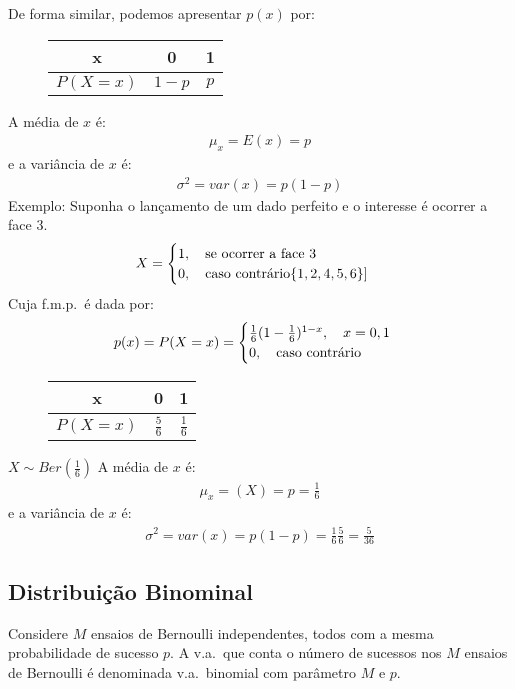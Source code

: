  De forma similar, podemos apresentar $p(x)$ por:
 \begin{figure} 
   \centering
   \begin{tabular}{c c c}
     \toprule
     x&0&1\\ \midrule
     $P(X=x)$&$1-p$&$p$\\ \bottomrule
   \end{tabular}
   \label{fig:7}
 \end{figure}
 A média de $x$ é: 
 \begin{align}
   \mu_{x}=E(x)=p
 \end{align}
 e a variância de $x$ é: 
 \begin{align}
   \sigma^2 = var(x)=p (1-p)
 \end{align}
 Exemplo: Suponha o lançamento de um dado perfeito e o interesse é ocorrer a face
 3.
 \begin{align*}
   X=\begin{cases}
     1, \text{\quad se ocorrer a face }3\\
     0, \text{\quad caso contrário}\{1,2,4,5,6\}]
   \end{cases}
 \end{align*}
 Cuja f.m.p.\ é dada por:
 \begin{align}
   p(x)=P(X=x)=\begin{cases}
     \frac{1}{6}(1-\frac{1}{6})^{1-x}, \text{\quad}x=0,1\\
     0, \text{\quad caso contrário}
   \end{cases}
 \end{align}
 \begin{figure} 
   \centering
   \begin{tabular}{c c c}
     \toprule
     x&0&1\\ \midrule
     $P(X=x)$&$\frac{5}{6}$&$\frac{1}{6}$\\ \bottomrule
   \end{tabular}
   \label{fig:8}
 \end{figure}
 $X \sim Ber(\frac{1}{6})$
 A média de $x$ é: 
 \begin{align*}
   \mu_{x}=(X)=p=\frac{1}{6}
 \end{align*}
 e a variância de $x$ é: 
 \begin{align*}
   \sigma^2= var(x)=p(1-p)=\frac{1}{6}\frac{5}{6}=\frac{5}{36}
 \end{align*}
 \subsection{Distribuição Binominal}
 Considere $M$ ensaios de Bernoulli independentes, todos com a mesma probabilidade
 de sucesso $p$. A v.a.\ que conta o número de sucessos nos $M$ ensaios de Bernoulli
 é denominada v.a.\ binomial com parâmetro $M$ e $p$.

